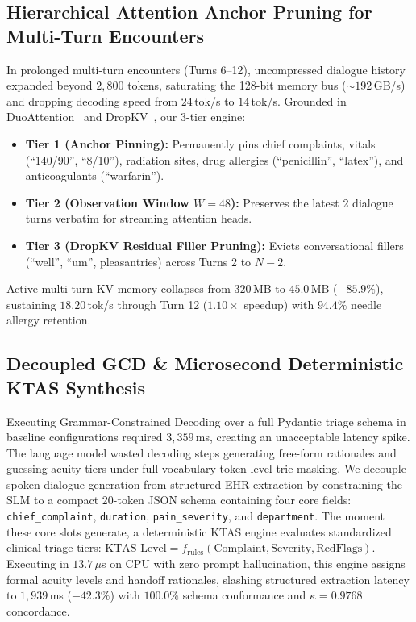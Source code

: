 \documentclass[10pt,journal,compsoc]{IEEEtran}
\begin{document}
\subsection{Hierarchical Attention Anchor Pruning for Multi-Turn Encounters}
In prolonged multi-turn encounters (Turns 6--12), uncompressed dialogue history expanded beyond $2{,}800$ tokens, saturating the 128-bit memory bus ($\sim 192$\,GB/s) and dropping decoding speed from $24$\,tok/s to $14$\,tok/s. Grounded in DuoAttention~\cite{duoattention2025} and DropKV~\cite{dropkv2026}, our 3-tier engine:
\begin{itemize}
    \item \textbf{Tier 1 (Anchor Pinning):} Permanently pins chief complaints, vitals (``140/90'', ``8/10''), radiation sites, drug allergies (``penicillin'', ``latex''), and anticoagulants (``warfarin'').
    \item \textbf{Tier 2 (Observation Window $W=48$):} Preserves the latest 2 dialogue turns verbatim for streaming attention heads.
    \item \textbf{Tier 3 (DropKV Residual Filler Pruning):} Evicts conversational fillers (``well'', ``um'', pleasantries) across Turns 2 to $N-2$.
\end{itemize}
Active multi-turn KV memory collapses from $320$\,MB to $45.0$\,MB ($-85.9\%$), sustaining $18.20$\,tok/s through Turn 12 ($1.10\times$ speedup) with $94.4\%$ needle allergy retention.

\subsection{Decoupled GCD \& Microsecond Deterministic KTAS Synthesis}
Executing Grammar-Constrained Decoding over a full Pydantic triage schema in baseline configurations required $3{,}359$\,ms, creating an unacceptable latency spike. The language model wasted decoding steps generating free-form rationales and guessing acuity tiers under full-vocabulary token-level trie masking.
We decouple spoken dialogue generation from structured EHR extraction by constraining the SLM to a compact 20-token JSON schema containing four core fields: \texttt{chief\_complaint}, \texttt{duration}, \texttt{pain\_severity}, and \texttt{department}. The moment these core slots generate, a deterministic KTAS engine evaluates
standardized clinical triage tiers: $\text{KTAS Level} = f_{\text{rules}}(\text{Complaint}, \text{Severity}, \text{RedFlags})$. Executing in $13.7\,\mu$s on CPU with zero prompt hallucination, this engine assigns formal acuity levels and handoff rationales, slashing structured extraction latency to $1{,}939$\,ms ($-42.3\%$) with $100.0\%$
schema conformance and $\kappa = 0.9768$ concordance.
\end{document}
